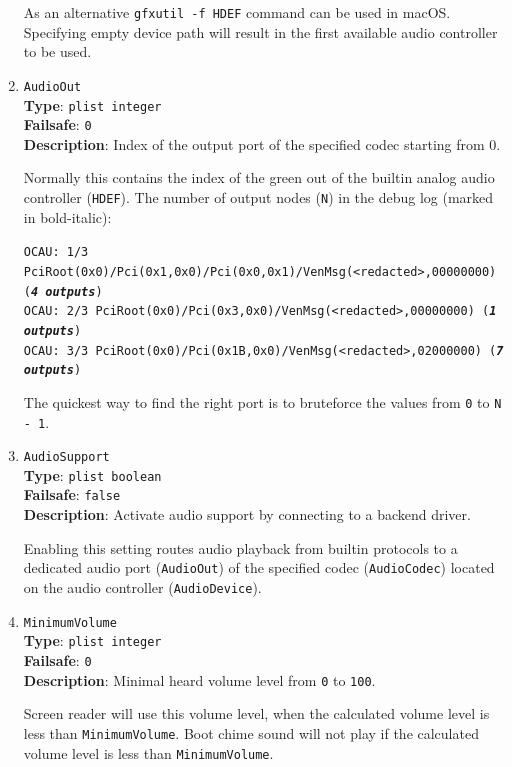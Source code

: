 \documentclass[]{article}
\begin{document}
\begin{enumerate}
  As an alternative \texttt{gfxutil -f HDEF} command can be used in macOS. Specifying empty device
  path will result in the first available audio controller to be used.

\item
  \texttt{AudioOut}\\
  \textbf{Type}: \texttt{plist\ integer}\\
  \textbf{Failsafe}: \texttt{0}\\
  \textbf{Description}: Index of the output port of the specified codec starting from 0.

  Normally this contains the index of the green out of the builtin analog audio controller (\texttt{HDEF}).
  The number of output nodes (\texttt{N}) in the debug log (marked in bold-italic):

  \texttt{OCAU: 1/3 PciRoot(0x0)/Pci(0x1,0x0)/Pci(0x0,0x1)/VenMsg(<redacted>,00000000) (\textit{\textbf{4 outputs}})}\\
  \texttt{OCAU: 2/3 PciRoot(0x0)/Pci(0x3,0x0)/VenMsg(<redacted>,00000000) (\textit{\textbf{1 outputs}})}\\
  \texttt{OCAU: 3/3 PciRoot(0x0)/Pci(0x1B,0x0)/VenMsg(<redacted>,02000000) (\textit{\textbf{7 outputs}})}

  The quickest way to find the right port is to bruteforce the values from \texttt{0} to \texttt{N - 1}.

\item
  \texttt{AudioSupport}\\
  \textbf{Type}: \texttt{plist\ boolean}\\
  \textbf{Failsafe}: \texttt{false}\\
  \textbf{Description}: Activate audio support by connecting to a backend driver.

  Enabling this setting routes audio playback from builtin protocols to a dedicated
  audio port (\texttt{AudioOut}) of the specified codec (\texttt{AudioCodec}) located
  on the audio controller (\texttt{AudioDevice}).

\item
  \texttt{MinimumVolume}\\
  \textbf{Type}: \texttt{plist\ integer}\\
  \textbf{Failsafe}: \texttt{0}\\
  \textbf{Description}: Minimal heard volume level from \texttt{0} to \texttt{100}.

  Screen reader will use this volume level, when the calculated volume level is
  less than \texttt{MinimumVolume}. Boot chime sound will not play if the calculated
  volume level is less than \texttt{MinimumVolume}.


\end{enumerate}
\end{document}
